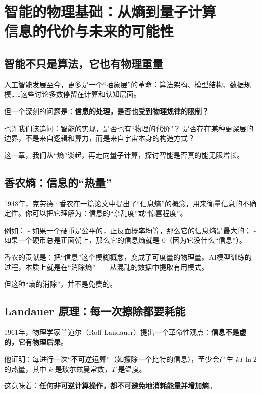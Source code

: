 \chapter{智能的物理基础：从熵到量子计算\\\large{}信息的代价与未来的可能性}

\section*{智能不只是算法，它也有物理重量}

人工智能发展至今，更多是一个“抽象层”的革命：算法架构、模型结构、数据规模……这些讨论多数停留在计算和认知层面。

但一个深刻的问题是：\textbf{信息的处理，是否也受到物理规律的限制？}

也许我们该追问：智能的实现，是否也有“物理的代价”？  
是否存在某种更深层的边界，不是来自逻辑和算力，而是来自宇宙本身的构造方式？

这一章，我们从“熵”谈起，再走向量子计算，探讨智能是否真的能无限增长。

\section*{香农熵：信息的“热量”}

1948年，克劳德·香农在一篇论文中提出了“信息熵”的概念，用来衡量信息的不确定性。你可以把它理解为：信息的“杂乱度”或“惊喜程度”。

例如：
- 如果一个硬币是公平的，正反面概率均等，那么它的信息熵是最大的；
- 如果一个硬币总是正面朝上，那么它的信息熵就是 0（因为它没什么“信息”）。

香农的贡献是：把“信息”这个模糊概念，变成了可度量的物理量。AI模型训练的过程，本质上就是在“消除熵”——从混乱的数据中提取有用模式。

但这种“熵的消除”，并不是免费的。

\section*{Landauer 原理：每一次擦除都要耗能}

1961年，物理学家兰道尔（Rolf Landauer）提出一个革命性观点：\textbf{信息不是虚的，它有物理后果}。

他证明：每进行一次“不可逆运算”（如擦除一个比特的信息），至少会产生 $kT\ln2$ 的热量，其中 $k$ 是玻尔兹曼常数，$T$ 是温度。

这意味着：\textbf{任何非可逆计算操作，都不可避免地消耗能量并增加熵}。

